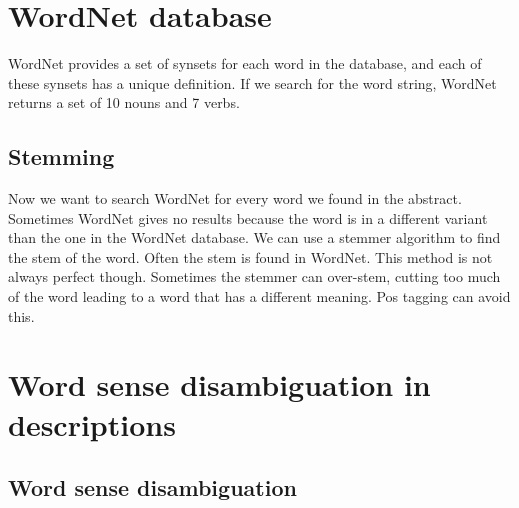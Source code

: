 
\section{WordNet database}
WordNet provides a set of synsets for each word in the database, and each of these synsets has a unique definition. If we search for the word string, WordNet returns a set of 10 nouns and 7 verbs. %

\subsection{Stemming}
Now we want to search WordNet for every word we found in the abstract. Sometimes WordNet gives no results because the word is in a different variant than the one in the WordNet database. We can use a stemmer algorithm to find the stem of the word. Often the stem is found in WordNet. This method is not always perfect though. Sometimes the stemmer can over-stem, cutting too much of the word leading to a word that has a different meaning. %
Pos tagging can avoid this.


\section{Word sense disambiguation in descriptions}
\subsection{Word sense disambiguation}
